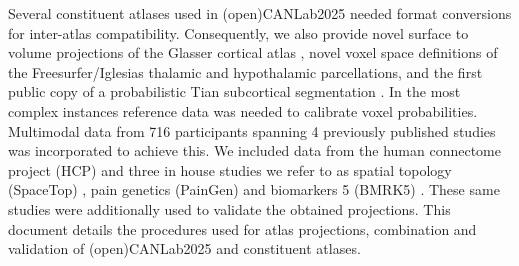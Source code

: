 \documentclass[10pt,letterpaper]{article}
\begin{document}
Several constituent atlases used in (open)CANLab2025 needed format conversions for inter-atlas compatibility. Consequently, we also provide novel surface to volume projections of the Glasser cortical atlas \cite{Glasser2016}, novel voxel space definitions of the Freesurfer/Iglesias thalamic \cite{Iglesias2018} and hypothalamic \cite{Billot2020} parcellations, and the first public copy of a probabilistic Tian subcortical segmentation \cite{Tian2020}. In the most complex instances reference data was needed to calibrate voxel probabilities. Multimodal data from 716 participants spanning 4 previously published studies was incorporated to achieve this. We included data from the human connectome project (HCP)\cite{Vanessen2013} and three in house studies we refer to as spatial topology (SpaceTop) \cite{Jung2025}, pain genetics (PainGen) \cite{Botvinik-Nezer2023.09.21.558825} and biomarkers 5 (BMRK5) \cite{Losin2020}. These same studies were additionally used to validate the obtained projections. This document details the procedures used for atlas projections, combination and validation of (open)CANLab2025 and constituent atlases.
\end{document}
